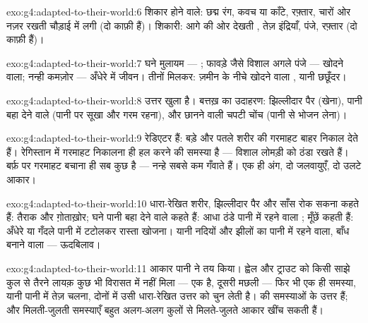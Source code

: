 \begin{solution}{exo:g4:adapted-to-their-world:6}
शिकार होने वाले: छद्म रंग, कवच या काँटे, रफ़्तार, चारों ओर नज़र रखती
चौड़ाई में लगी  (दो काफ़ी हैं)। शिकारी: आगे की ओर देखती ,
तेज़ इंद्रियाँ, पंजे, रफ़्तार (दो काफ़ी हैं)।
\end{solution}

\begin{solution}{exo:g4:adapted-to-their-world:7}
घने मुलायम  --- ; फावड़े जैसे विशाल अगले पंजे --- खोदने
वाला; नन्ही कमज़ोर  --- अँधेरे में जीवन। तीनों मिलकर: ज़मीन के
नीचे खोदने वाला , यानी छछूँदर।
\end{solution}

\begin{solution}{exo:g4:adapted-to-their-world:8}
उत्तर खुला है। बत्तख़ का उदाहरण: झिल्लीदार पैर (खेना), पानी बहा देने
वाले  (पानी पर सूखा और गरम रहना), और छानने वाली चपटी चोंच (पानी से
भोजन लेना)।
\end{solution}

\begin{solution}{exo:g4:adapted-to-their-world:9}
 रेडिएटर हैं: बड़े और पतले  शरीर की गरमाहट बाहर निकाल देते हैं।
रेगिस्तान में गरमाहट निकालना ही हल करने की समस्या है --- विशाल 
लोमड़ी को ठंडा रखते हैं। बर्फ़ पर गरमाहट बचाना ही सब कुछ है --- नन्हे
 सबसे कम गँवाते हैं। एक ही अंग, दो जलवायुएँ, दो उलटे आकार।
\end{solution}

\begin{solution}{exo:g4:adapted-to-their-world:10}
धारा-रेखित शरीर, झिल्लीदार पैर और साँस रोक सकना कहते हैं: तैराक और
ग़ोताख़ोर; घने पानी बहा देने वाले  कहते हैं: आधा ठंडे पानी में रहने
वाला ; मूँछें कहती हैं: अँधेरे या गँदले पानी में टटोलकर रास्ता
खोजना। यानी नदियों और झीलों का पानी में रहने वाला, बाँध बनाने वाला
 --- ऊदबिलाव।
\end{solution}

\begin{solution}{exo:g4:adapted-to-their-world:11}
आकार पानी ने तय किया। ह्वेल और ट्राउट को किसी साझे कुल से तैरने लायक़
कुछ भी विरासत में नहीं मिला --- एक  है, दूसरी मछली --- फिर भी
एक ही समस्या, यानी पानी में तेज़ चलना, दोनों में उसी धारा-रेखित उत्तर
को चुन लेती है।   की समस्याओं के उत्तर हैं; और मिलती-जुलती
समस्याएँ बहुत अलग-अलग कुलों से मिलते-जुलते आकार खींच सकती हैं।
\end{solution}
